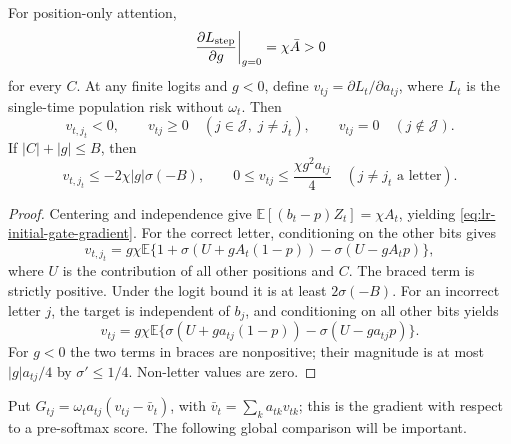 \begin{lrlemma}
\label{lem:lr-signs}
For position-only attention,
\begin{equation}\label{eq:lr-initial-gate-gradient}
 \left.\frac{\partial L_{\mathrm{step}}}{\partial g}\right|_{g=0}
 =\chi\bar A>0
\end{equation}
for every $C$.  At any finite logits and $g<0$, define
$v_{tj}=\partial L_t/\partial a_{tj}$, where $L_t$ is the single-time
population risk without $\omega_t$.  Then
\begin{equation}\label{eq:lr-feature-source-signs}
 v_{t,j_t}<0,\qquad v_{tj}\ge0
 \quad(j\in\mathcal J,\;j\ne j_t),\qquad
 v_{tj}=0\quad(j\notin\mathcal J).
\end{equation}
If $|C|+|g|\le B$, then
\begin{equation}\label{eq:lr-source-bounds}
 v_{t,j_t}\le-2\chi|g|\sigma(-B),\qquad
 0\le v_{tj}\le\frac{\chi g^2a_{tj}}4\quad(j\ne j_t\text{ a letter}).
\end{equation}
\end{lrlemma}
\begin{proof}
Centering and independence give
$\mathbb E[(b_t-p)Z_t]=\chi A_t$, yielding
\eqref{eq:lr-initial-gate-gradient}.  For the correct letter,
conditioning on the other bits gives
\[
 v_{t,j_t}=g\chi\mathbb E
 \{1+\sigma(U+gA_t(1-p))-\sigma(U-gA_tp)\},
\]
where $U$ is the contribution of all other positions and $C$.
The braced term is strictly positive.  Under the logit bound it is at
least $2\sigma(-B)$.  For an incorrect letter $j$, the target is
independent of $b_j$, and conditioning on all other bits yields
\[
 v_{tj}=g\chi\mathbb E
 \{\sigma(U+ga_{tj}(1-p))-\sigma(U-ga_{tj}p)\}.
\]
For $g<0$ the two terms in braces are nonpositive; their magnitude is
at most $|g|a_{tj}/4$ by $\sigma'\le1/4$.  Non-letter values are zero.
\end{proof}

Put $G_{tj}=\omega_ta_{tj}(v_{tj}-\bar v_t)$, with
$\bar v_t=\sum_ka_{tk}v_{tk}$; this is the gradient with respect to a
pre-softmax score.  The following global comparison will be important.


